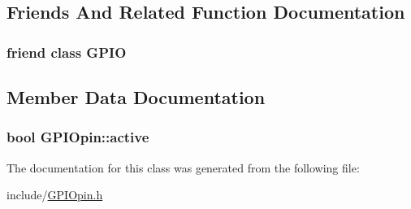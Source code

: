 \subsection{Friends And Related Function Documentation}
\hypertarget{class_g_p_i_opin_a44d5d3921b935cbde07cb645da31fdae}{
\subsubsection[{G\-P\-I\-O}]{\setlength{\rightskip}{0pt plus 5cm}friend class G\-P\-I\-O\hspace{0.3cm}{\ttfamily [friend]}}}\label{class_g_p_i_opin_a44d5d3921b935cbde07cb645da31fdae}


\subsection{Member Data Documentation}
\hypertarget{class_g_p_i_opin_ab51fd28869cad5b9fdb38a983cb2d1c5}{
\subsubsection[{active}]{\setlength{\rightskip}{0pt plus 5cm}bool G\-P\-I\-Opin\-::active\hspace{0.3cm}{\ttfamily [protected]}}}\label{class_g_p_i_opin_ab51fd28869cad5b9fdb38a983cb2d1c5}


The documentation for this class was generated from the following file\-:\begin{DoxyCompactItemize}
\item 
include/\hyperlink{_g_p_i_opin_8h}{G\-P\-I\-Opin.\-h}\end{DoxyCompactItemize}
